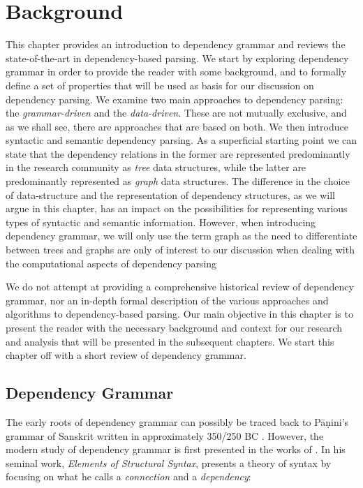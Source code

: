 \chapter{Background}
\label{chap:background}

This chapter provides an introduction to dependency grammar and reviews the state-of-the-art in dependency-based parsing. We start by exploring dependency grammar in order to provide the reader with some background, and to formally define a set of properties that will be used as basis for our discussion on dependency parsing. We examine two main approaches to dependency parsing: the \textit{grammar-driven} and the \textit{data-driven}. These are not mutually exclusive, and as we shall see, there are approaches that are based on both. We then introduce syntactic and semantic dependency parsing. As a superficial starting point we can state that the dependency relations in the former are represented predominantly in the research community as \textit{tree} data structures, while the latter are predominantly represented as \textit{graph} data structures. The difference in the choice of data-structure and the representation of dependency structures, as we will argue in this chapter, has an impact on the possibilities for representing various types of syntactic and semantic information. However, when introducing dependency grammar, we will only use the term graph as the need to differentiate between trees and graphs are only of interest to our discussion when dealing with the computational aspects of dependency parsing

We do not attempt at providing a comprehensive historical review of dependency grammar, nor an in-depth formal description of the various approaches and algorithms to dependency-based parsing. Our main objective in this chapter is to present the reader with the necessary background and context for our research and analysis that will be presented in the subsequent chapters. We start this chapter off with a short review of dependency grammar.

\section{Dependency Grammar}
\label{grammar}

The early roots of dependency grammar can possibly be traced back to P\={a}\d{n}ini's grammar of Sanskrit written in approximately 350/250 BC \cite{Kruijff:02}. However, the modern study of  dependency grammar is first presented in the works of \citeauthor{Tes:15}. In his seminal work, \textit{Elements of Structural Syntax}, \citeauthor{Tes:15} presents a theory of syntax by focusing on what he calls a \textit{connection} and a \textit{dependency}:


